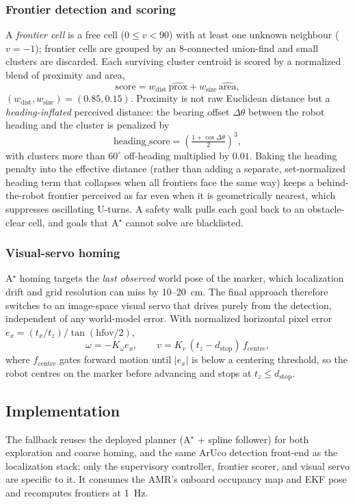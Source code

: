 \documentclass[conference]{IEEEtran}
\begin{document}
\subsubsection{Frontier detection and scoring}
A \emph{frontier cell} is a free cell ($0\le v<90$) with at least one unknown
neighbour ($v=-1$); frontier cells are grouped by an 8-connected union-find and
small clusters are discarded. Each surviving cluster centroid is scored by a
normalized blend of proximity and area,
\begin{equation}
\text{score}=w_\text{dist}\,\widehat{\text{prox}}+w_\text{size}\,\widehat{\text{area}},
\end{equation}
$(w_\text{dist},w_\text{size})=(0.85,0.15)$. Proximity is not raw Euclidean
distance but a \emph{heading-inflated} perceived distance: the bearing offset
$\Delta\theta$ between the robot heading and the cluster is penalized by
\begin{equation}
\text{heading\_score}=\left(\tfrac{1+\cos\Delta\theta}{2}\right)^{3},
\end{equation}
with clusters more than $60^\circ$ off-heading multiplied by $0.01$. Baking the
heading penalty into the effective distance (rather than adding a separate,
set-normalized heading term that collapses when all frontiers face the same way)
keeps a behind-the-robot frontier perceived as far even when it is geometrically
nearest, which suppresses oscillating U-turns. A safety walk pulls each goal
back to an obstacle-clear cell, and goals that A$^\star$ cannot solve are
blacklisted.

\subsubsection{Visual-servo homing}
A$^\star$ homing targets the \emph{last observed} world pose of the marker, which
localization drift and grid resolution can miss by 10--20~cm. The final approach
therefore switches to an image-space visual servo that drives purely from the
detection, independent of any world-model error. With normalized horizontal pixel
error $e_x=(t_x/t_z)/\tan(\text{hfov}/2)$,
\begin{equation}
\omega=-K_\omega e_x,\qquad v=K_v\,(t_z-d_\text{stop})\,f_\text{centre},
\end{equation}
where $f_\text{centre}$ gates forward motion until $|e_x|$ is below a centering
threshold, so the robot centres on the marker before advancing and stops at
$t_z\le d_\text{stop}$.

\subsection{Implementation}
The fallback reuses the deployed planner (A$^\star$ + spline follower) for both
exploration and coarse homing, and the same ArUco detection front-end as the
localization stack; only the supervisory controller, frontier scorer, and visual
servo are specific to it. It consumes the AMR's onboard occupancy map and EKF
pose and recomputes frontiers at \SI{1}{\hertz}.
\end{document}
